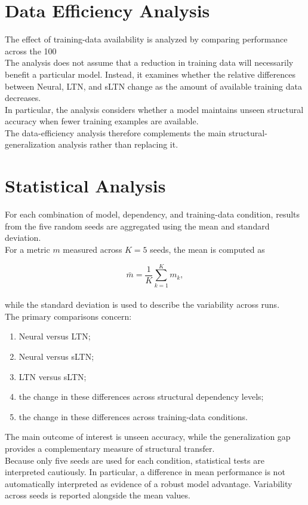 \section{Data Efficiency Analysis}

\noindent
The effect of training-data availability is analyzed by comparing performance across the 100%
\\
The analysis does not assume that a reduction in training data will necessarily benefit a particular model. Instead, it examines whether the relative differences between Neural, LTN, and sLTN change as the amount of available training data decreases.
\\
In particular, the analysis considers whether a model maintains unseen structural accuracy when fewer training examples are available.
\\
The data-efficiency analysis therefore complements the main structural-generalization analysis rather than replacing it.

\section{Statistical Analysis}

\noindent
For each combination of model, dependency, and training-data condition, results from the five random seeds are aggregated using the mean and standard deviation.
\\
For a metric $m$ measured across $K=5$ seeds, the mean is computed as

$$
\bar{m}
=
\frac{1}{K}
\sum_{k=1}^{K}m_k,
$$
\\
while the standard deviation is used to describe the variability across runs.
\noindent \\
The primary comparisons concern:

\begin{enumerate}
\item Neural versus LTN;
\item Neural versus sLTN;
\item LTN versus sLTN;
\item the change in these differences across structural dependency levels;
\item the change in these differences across training-data conditions.
\end{enumerate}

\noindent
The main outcome of interest is unseen accuracy, while the generalization gap provides a complementary measure of structural transfer.
\\
Because only five seeds are used for each condition, statistical tests are interpreted cautiously. In particular, a difference in mean performance is not automatically interpreted as evidence of a robust model advantage. Variability across seeds is reported alongside the mean values.

